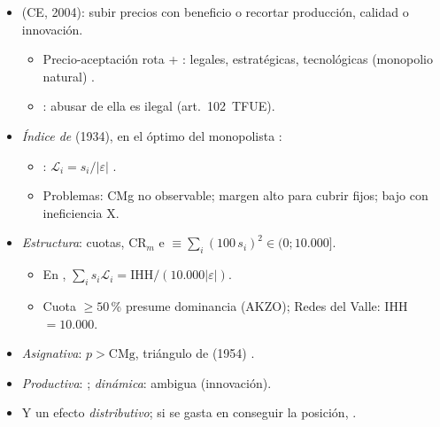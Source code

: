 \documentclass{article}
\begin{document}
\begin{columnas}
\begin{itemize}
\item {} (CE, 2004): subir precios con beneficio o recortar producción, calidad o innovación.
  \begin{itemize}
  \item Precio-aceptación rota + : legales, estratégicas, tecnológicas (monopolio natural) .
  \item {}: abusar de ella es ilegal (art.~102~TFUE).
  \end{itemize}
\end{itemize}
\begin{itemize}
\item \emph{Índice de } (1934), en el óptimo del monopolista :
  \begin{itemize}
  \item {}: $\mathcal{L}_i=s_i/|\varepsilon|$ .
  \item Problemas: CMg no observable; margen alto para cubrir fijos; bajo con ineficiencia X.
  \end{itemize}
\item \emph{Estructura}: cuotas, $\mathrm{CR}_m$ e  $\equiv\sum_i(100\,s_i)^2\in(0;10.000]$.
  \begin{itemize}
  \item En , $\sum_is_i\mathcal{L}_i=\mathrm{IHH}/(10.000|\varepsilon|)$.
  \item Cuota $\geq50$\,\% presume dominancia (AKZO); Redes del Valle: IHH $=10.000$.
  \end{itemize}
\end{itemize}
\begin{itemize}
\item \emph{Asignativa}: $p>\mathrm{CMg}$, triángulo de  (1954) .
\item \emph{Productiva}: ; \emph{dinámica}: ambigua (innovación).
\item Y un efecto \emph{distributivo}; si se gasta en conseguir la posición, .
\end{itemize}

\end{columnas}
\end{document}
